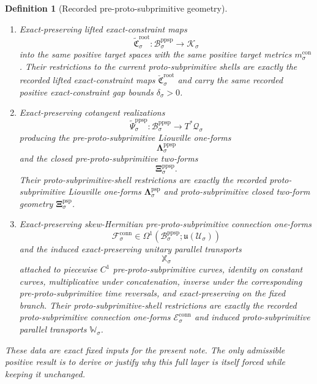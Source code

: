 \documentclass[11pt]{article}
\newcommand{\LieU}{\mathfrak u}
\newcommand{\RootClass}[1]{\mathscr U_{#1}}
\newcommand{\ConfigSpace}[1]{\mathcal Q_{#1}}
\newcommand{\ShellMetric}[1]{m_{#1}^{\mathrm{sh}}}
\newcommand{\ShellGap}[1]{\eta_{#1}}
\newcommand{\ConstraintTarget}[1]{\mathcal K_{#1}}
\newcommand{\ConstraintMetric}[1]{m_{#1}^{\mathrm{con}}}
\newcommand{\ConstraintGap}[1]{\delta_{#1}}
\newcommand{\ProtoSubprimLiftedShell}[1]{\check{\mathfrak D}_{#1}^{\mathrm{root}}}
\newcommand{\ProtoSubprimConstraintMap}[1]{\check{\mathfrak C}_{#1}^{\mathrm{root}}}
\newcommand{\ProtoSubprimLiouville}[1]{\boldsymbol{\Lambda}_{#1}^{\mathrm{psp}}}
\newcommand{\ProtoSubprimTwo}[1]{\boldsymbol{\Xi}_{#1}^{\mathrm{psp}}}
\newcommand{\ProtoSubprimConnectionForm}[1]{\mathcal E_{#1}^{\mathrm{conn}}}
\newcommand{\ProtoSubprimTransport}[1]{\mathbb W_{#1}}
\newcommand{\PreProtoSubprimSpace}[1]{\mathcal B_{#1}^{\mathrm{ppsp}}}
\newcommand{\PreProtoSubprimConstraintMap}[1]{\widetilde{\mathfrak C}_{#1}^{\mathrm{root}}}
\newcommand{\PreProtoSubprimCotangentRealization}[1]{\widetilde{\Psi}_{#1}^{\mathrm{ppsp}}}
\newcommand{\PreProtoSubprimLiouville}[1]{\boldsymbol{\Lambda}_{#1}^{\mathrm{ppsp}}}
\newcommand{\PreProtoSubprimTwo}[1]{\boldsymbol{\Xi}_{#1}^{\mathrm{ppsp}}}
\newcommand{\PreProtoSubprimConnectionForm}[1]{\mathcal F_{#1}^{\mathrm{conn}}}
\newcommand{\PreProtoSubprimTransport}[1]{\mathbb X_{#1}}
\newtheorem{definition}{Definition}
\begin{document}
\begin{definition}[Recorded pre-proto-subprimitive geometry]
\begin{enumerate}
\[    \]
    into the same positive shell target spaces with the same positive shell target metrics \(\ShellMetric{\sigma}\). Their restrictions to the current proto-subprimitive exact-constraint shells are exactly the recorded lifted shell maps \(\ProtoSubprimLiftedShell{\sigma}\) and carry the same recorded positive shell-gap bounds \(\ShellGap{\sigma}>0\) on the current seed shells.
    \item Exact-preserving lifted exact-constraint maps
    \[
    \PreProtoSubprimConstraintMap{\sigma}:\PreProtoSubprimSpace{\sigma}\to\ConstraintTarget{\sigma}
    \]
    into the same positive target spaces with the same positive target metrics \(\ConstraintMetric{\sigma}\). Their restrictions to the current proto-subprimitive shells are exactly the recorded lifted exact-constraint maps \(\ProtoSubprimConstraintMap{\sigma}\) and carry the same recorded positive exact-constraint gap bounds \(\ConstraintGap{\sigma}>0\).
    \item Exact-preserving cotangent realizations
    \[
    \PreProtoSubprimCotangentRealization{\sigma}:\PreProtoSubprimSpace{\sigma}\to T^*\ConfigSpace{\sigma}
    \]
    producing the pre-proto-subprimitive Liouville one-forms
    \[
    \PreProtoSubprimLiouville{\sigma}
    \]
    and the closed pre-proto-subprimitive two-forms
    \[
    \PreProtoSubprimTwo{\sigma}.
    \]
    Their proto-subprimitive-shell restrictions are exactly the recorded proto-subprimitive Liouville one-forms \(\ProtoSubprimLiouville{\sigma}\) and proto-subprimitive closed two-form geometry \(\ProtoSubprimTwo{\sigma}\).
    \item Exact-preserving skew-Hermitian pre-proto-subprimitive connection one-forms
    \[
    \PreProtoSubprimConnectionForm{\sigma}\in \Omega^1(\PreProtoSubprimSpace{\sigma};\LieU(\RootClass{\sigma}))
    \]
    and the induced exact-preserving unitary parallel transports
    \[
    \PreProtoSubprimTransport{\sigma}
    \]
    attached to piecewise \(C^1\) pre-proto-subprimitive curves, identity on constant curves, multiplicative under concatenation, inverse under the corresponding pre-proto-subprimitive time reversals, and exact-preserving on the fixed branch. Their proto-subprimitive-shell restrictions are exactly the recorded proto-subprimitive connection one-forms \(\ProtoSubprimConnectionForm{\sigma}\) and induced proto-subprimitive parallel transports \(\ProtoSubprimTransport{\sigma}\).
\end{enumerate}
These data are exact fixed inputs for the present note. The only admissible positive result is to derive or justify why this full layer is itself forced while keeping it unchanged.
\end{definition}
\end{document}
